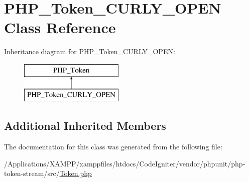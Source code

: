 \hypertarget{class_p_h_p___token___c_u_r_l_y___o_p_e_n}{}\section{P\+H\+P\+\_\+\+Token\+\_\+\+C\+U\+R\+L\+Y\+\_\+\+O\+P\+EN Class Reference}
\label{class_p_h_p___token___c_u_r_l_y___o_p_e_n}
Inheritance diagram for P\+H\+P\+\_\+\+Token\+\_\+\+C\+U\+R\+L\+Y\+\_\+\+O\+P\+EN\+:\begin{figure}[H]
\begin{center}
\leavevmode
\includegraphics[height=2.000000cm]{class_p_h_p___token___c_u_r_l_y___o_p_e_n}
\end{center}
\end{figure}
\subsection*{Additional Inherited Members}


The documentation for this class was generated from the following file\+:\begin{DoxyCompactItemize}
\item 
/\+Applications/\+X\+A\+M\+P\+P/xamppfiles/htdocs/\+Code\+Igniter/vendor/phpunit/php-\/token-\/stream/src/\mbox{\hyperlink{_token_8php}{Token.\+php}}\end{DoxyCompactItemize}
